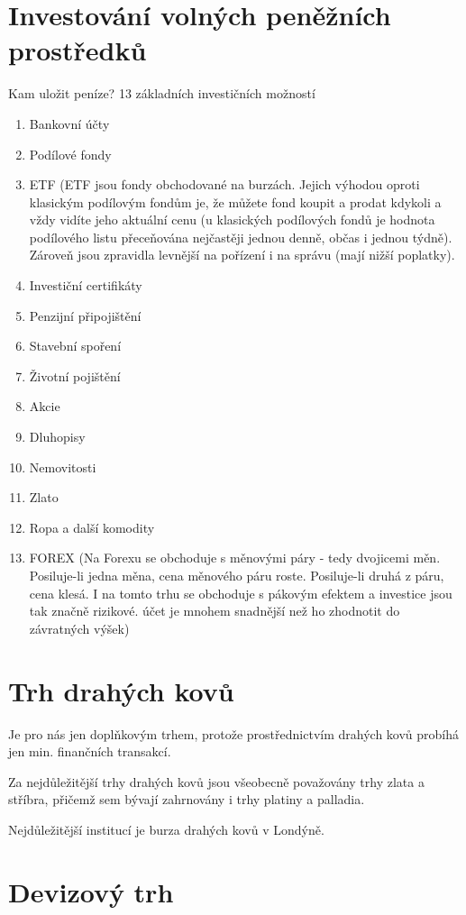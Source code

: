 \section*{Investování volných peněžních prostředků}

Kam uložit peníze? 13 základních investičních možností
\begin{enumerate}
    \item Bankovní účty
    \item Podílové fondy
    \item ETF (ETF jsou fondy obchodované na burzách. Jejich výhodou oproti klasickým podílovým fondům je, že můžete fond koupit a prodat kdykoli a vždy vidíte jeho aktuální cenu (u klasických podílových fondů je hodnota podílového listu přeceňována nejčastěji jednou denně, občas i jednou týdně). Zároveň jsou zpravidla levnější na pořízení i na správu (mají nižší poplatky).
    \item Investiční certifikáty
    \item Penzijní připojištění
    \item Stavební spoření
    \item Životní pojištění
    \item Akcie
    \item Dluhopisy
    \item Nemovitosti
    \item Zlato
    \item Ropa a další komodity
    \item FOREX (Na Forexu se obchoduje s měnovými páry - tedy dvojicemi měn. Posiluje-li jedna měna, cena měnového páru roste. Posiluje-li druhá z páru, cena klesá. I na tomto trhu se obchoduje s pákovým efektem a investice jsou tak značně rizikové.  účet je mnohem snadnější než ho zhodnotit do závratných výšek)
\end{enumerate}

\section*{Trh drahých kovů}
Je pro nás jen doplňkovým trhem, protože prostřednictvím drahých kovů probíhá jen min. finančních transakcí.

Za nejdůležitější trhy drahých kovů jsou všeobecně považovány trhy zlata a stříbra, přičemž sem bývají zahrnovány i trhy platiny a palladia.

Nejdůležitější institucí je burza drahých kovů v Londýně.

\section*{Devizový trh}

